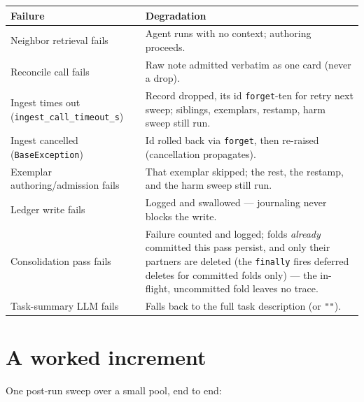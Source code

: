 \documentclass[11pt]{article}
\newcommand{\code}[1]{\texttt{\small #1}}
\begin{document}
\begin{longtable}{@{}p{}p{}@{}}
\toprule
\textbf{Failure} & \textbf{Degradation} \\
\midrule
\endhead
Neighbor retrieval fails & Agent runs with no context; authoring proceeds. \\
Reconcile call fails & Raw note admitted verbatim as one card (never a drop). \\
Ingest times out (\code{ingest\_call\_timeout\_s}) & Record dropped, its id
\code{forget}-ten for retry next sweep; siblings, exemplars, restamp, harm sweep
still run. \\
Ingest cancelled (\code{BaseException}) & Id rolled back via \code{forget}, then
re-raised (cancellation propagates). \\
Exemplar authoring/admission fails & That exemplar skipped; the rest, the
restamp, and the harm sweep still run. \\
Ledger write fails & Logged and swallowed --- journaling never blocks the write. \\
Consolidation pass fails & Failure counted and logged; folds \emph{already}
committed this pass persist, and only their partners are deleted (the \code{finally}
fires deferred deletes for committed folds only) --- the in-flight, uncommitted fold
leaves no trace. \\
Task-summary LLM fails & Falls back to the full task description (or \code{""}). \\
\bottomrule
\end{longtable}

\section{A worked increment}
\label{sec:worked}

One post-run sweep over a small pool, end to end:
\end{document}
